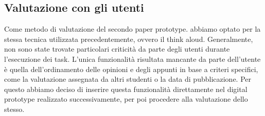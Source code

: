 \subsection{Valutazione con gli utenti}
Come metodo di valutazione del secondo paper prototype. abbiamo optato per la stessa tecnica utilizzata precedentemente, ovvero il think aloud. Generalmente, non
sono state trovate particolari criticità da parte degli utenti durante l’esecuzione dei task. L’unica funzionalità risultata mancante da parte dell’utente è quella
dell’ordinamento delle opinioni e degli appunti in base a criteri specifici, come la valutazione assegnata da altri studenti o la data di pubblicazione. Per questo
abbiamo deciso di inserire questa funzionalità direttamente nel digital prototype realizzato successivamente, per poi procedere alla valutazione dello stesso.